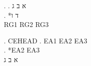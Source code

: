 
\ex.
\ag. א ב ג \\
\bg. *ד {} ו\\
\CommonGloss RG1 RG2 RG3\\

\begin{english}
\ex. CEHEAD
\ag. EA1 EA2 EA3\\
\bg. *EA2 {} EA3\\
\CommonGloss א ב ג\\
\end{english}

